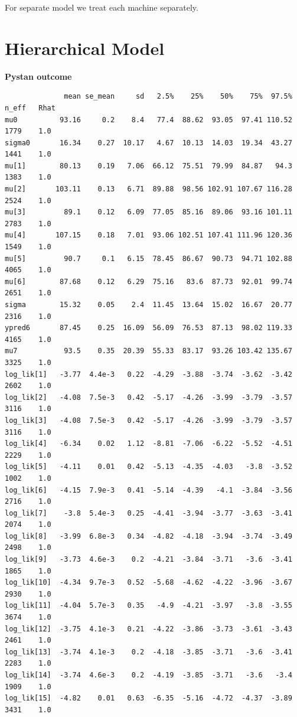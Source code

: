 \documentclass{article}
\begin{document}
For separate model we treat each machine separately.

\section{Hierarchical Model}
\textbf{Pystan outcome}
\begin{verbatim}
              mean se_mean     sd   2.5%    25%    50%    75%  97.5%  n_eff   Rhat
mu0          93.16     0.2    8.4   77.4  88.62  93.05  97.41 110.52   1779    1.0
sigma0       16.34    0.27  10.17   4.67  10.13  14.03  19.34  43.27   1441    1.0
mu[1]        80.13    0.19   7.06  66.12  75.51  79.99  84.87   94.3   1383    1.0
mu[2]       103.11    0.13   6.71  89.88  98.56 102.91 107.67 116.28   2524    1.0
mu[3]         89.1    0.12   6.09  77.05  85.16  89.06  93.16 101.11   2783    1.0
mu[4]       107.15    0.18   7.01  93.06 102.51 107.41 111.96 120.36   1549    1.0
mu[5]         90.7     0.1   6.15  78.45  86.67  90.73  94.71 102.88   4065    1.0
mu[6]        87.68    0.12   6.29  75.16   83.6  87.73  92.01  99.74   2651    1.0
sigma        15.32    0.05    2.4  11.45  13.64  15.02  16.67  20.77   2316    1.0
ypred6       87.45    0.25  16.09  56.09  76.53  87.13  98.02 119.33   4165    1.0
mu7           93.5    0.35  20.39  55.33  83.17  93.26 103.42 135.67   3325    1.0
log_lik[1]   -3.77  4.4e-3   0.22  -4.29  -3.88  -3.74  -3.62  -3.42   2602    1.0
log_lik[2]   -4.08  7.5e-3   0.42  -5.17  -4.26  -3.99  -3.79  -3.57   3116    1.0
log_lik[3]   -4.08  7.5e-3   0.42  -5.17  -4.26  -3.99  -3.79  -3.57   3116    1.0
log_lik[4]   -6.34    0.02   1.12  -8.81  -7.06  -6.22  -5.52  -4.51   2229    1.0
log_lik[5]   -4.11    0.01   0.42  -5.13  -4.35  -4.03   -3.8  -3.52   1002    1.0
log_lik[6]   -4.15  7.9e-3   0.41  -5.14  -4.39   -4.1  -3.84  -3.56   2716    1.0
log_lik[7]    -3.8  5.4e-3   0.25  -4.41  -3.94  -3.77  -3.63  -3.41   2074    1.0
log_lik[8]   -3.99  6.8e-3   0.34  -4.82  -4.18  -3.94  -3.74  -3.49   2498    1.0
log_lik[9]   -3.73  4.6e-3    0.2  -4.21  -3.84  -3.71   -3.6  -3.41   1865    1.0
log_lik[10]  -4.34  9.7e-3   0.52  -5.68  -4.62  -4.22  -3.96  -3.67   2930    1.0
log_lik[11]  -4.04  5.7e-3   0.35   -4.9  -4.21  -3.97   -3.8  -3.55   3674    1.0
log_lik[12]  -3.75  4.1e-3   0.21  -4.22  -3.86  -3.73  -3.61  -3.43   2461    1.0
log_lik[13]  -3.74  4.1e-3    0.2  -4.18  -3.85  -3.71   -3.6  -3.41   2283    1.0
log_lik[14]  -3.74  4.6e-3    0.2  -4.19  -3.85  -3.71   -3.6   -3.4   1909    1.0
log_lik[15]  -4.82    0.01   0.63  -6.35  -5.16  -4.72  -4.37  -3.89   3431    1.0

\end{verbatim}
\end{document}
